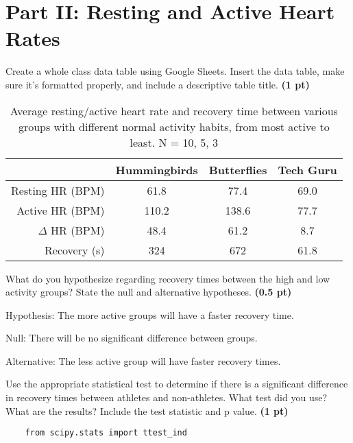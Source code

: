 \documentclass[12pt,a4paper]{article}
\begin{document}
\section*{Part II: Resting and Active Heart Rates}
\begin{enumerate}[font=\bfseries, wide, resume]
    {\color{under}\item Create a whole class data table using Google Sheets. Insert the data table, make sure it’s formatted properly, and include a descriptive table title. \textbf{(1 pt)}}
    
    \begin{table}[h]
        \centering
        \caption{Average resting/active heart rate and recovery time between various groups with different normal activity habits, from most active to least. N = 10, 5, 3}
        \begin{tabular}{rccc}
            \toprule
             & Hummingbirds  &  Butterflies  & Tech Guru  \\
            \midrule
            Resting HR (BPM) & 61.8 & 77.4 & 69.0 \\
            Active HR (BPM) & 110.2 & 138.6 & 77.7 \\
            $\Delta$ HR (BPM) & 48.4 & 61.2 & 8.7 \\
            Recovery (s)& 324 & 672 & 61.8 \\
            \bottomrule
            \end{tabular}
    \end{table}
    
    
    {\color{under}\item What do you hypothesize regarding recovery times between the high and low activity groups?  State the null and alternative hypotheses. \textbf{(0.5 pt)}}
    
    Hypothesis: The more active groups will have a faster recovery time. 

    Null: There will be no significant difference between groups. 

    Alternative: The less active group will have faster recovery times.
    
    {\color{under}\item  Use the appropriate statistical test to determine if there is a significant difference in recovery times between athletes and non-athletes.  What test did you use?  What are the results?  Include the test statistic and p value. \textbf{(1 pt)}}

    \begin{lstlisting}
    from scipy.stats import ttest_ind


\end{lstlisting}
\end{enumerate}
\end{document}
